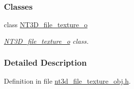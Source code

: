 \subsubsection*{Classes}
\begin{DoxyCompactItemize}
\item 
class \hyperlink{class_n_t3_d__file__texture__o}{NT3D\_\-file\_\-texture\_\-o}
\begin{DoxyCompactList}\small\item\em \hyperlink{class_n_t3_d__file__texture__o}{NT3D\_\-file\_\-texture\_\-o} class. \item\end{DoxyCompactList}\end{DoxyCompactItemize}


\subsubsection{Detailed Description}


Definition in file \hyperlink{nt3d__file__texture__obj_8h_source}{nt3d\_\-file\_\-texture\_\-obj.h}.

